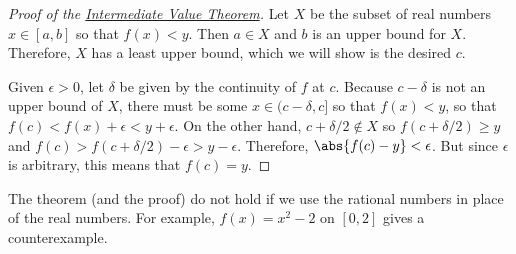 \begin{proof}[Proof of the {\hyperref[thm:IVT]{Intermediate Value Theorem}}]
\label{pf:IVT}%
Let $X$ be the subset of real numbers $x\in[a,b]$ so that $f(x)<y$.  Then $a\in X$ and $b$ is an upper bound for $X$.  Therefore, $X$ has a least upper bound, which we will show is the desired $c$.

Given $\epsilon>0$, let $\delta$ be given by the continuity of $f$ at $c$.  Because $c-\delta$ is not an upper bound of $X$, there must be some $x\in(c-\delta,c]$ so that $f(x)<y$, so that $f(c)<f(x)+\epsilon<y+\epsilon$.  On the other hand, $c+\delta/2\notin X$ so $f(c+\delta/2)\ge y$ and $f(c)>f(c+\delta/2)-\epsilon>y-\epsilon$.  Therefore, $\abs{f(c)-y}<\epsilon$.  But since $\epsilon$ is arbitrary, this means that $f(c)=y$.
\end{proof}

The theorem (and the proof) do not hold if we use the rational numbers in place of the real numbers.  For example, $f(x)=x^2-2$ on $[0,2]$ gives a counterexample.


